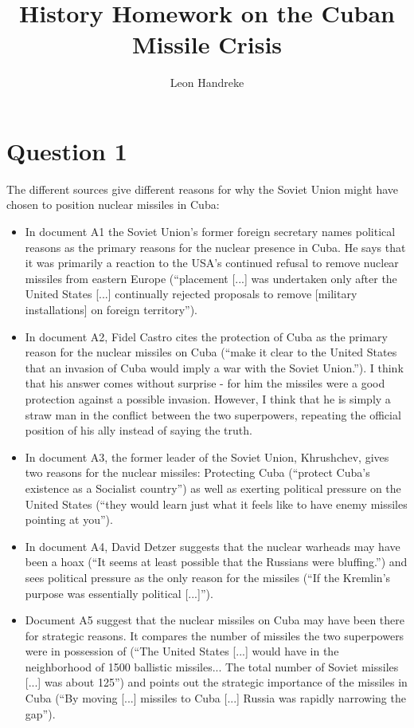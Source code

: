 \documentclass[11pt]{article}
\title{History Homework on the Cuban Missile Crisis}
\author{Leon Handreke}
\date{}                                           %
\begin{document}
\onehalfspacing
\maketitle
{}\selectfont

\section{Question 1}
The different sources give different reasons for why the Soviet Union might have chosen to position nuclear missiles in Cuba:

\begin{itemize}
\item In document A1 the Soviet Union's former foreign secretary names political reasons as the primary reasons for the nuclear presence in Cuba. He says that it was primarily a reaction to the USA's continued refusal to remove nuclear missiles from eastern Europe (``placement [...] was undertaken only after the United States [...] continually rejected proposals to remove [military installations] on foreign territory'').

\item In document A2, Fidel Castro cites the protection of Cuba as the primary reason for the nuclear missiles on Cuba (``make it clear to the United States that an invasion of Cuba would imply a war with the Soviet Union.''). I think that his answer comes without surprise - for him the missiles were a good protection against a possible invasion. However, I think that he is simply a straw man in the conflict between the two superpowers, repeating the official position of his ally instead of saying the truth.

\item In document A3, the former leader of the Soviet Union, Khrushchev, gives two reasons for the nuclear missiles: Protecting Cuba (``protect Cuba's existence as a Socialist country'') as well as exerting political pressure on the United States (``they would learn just what it feels like to have enemy missiles pointing at you'').

\item In document A4, David Detzer suggests that the nuclear warheads may have been a hoax (``It seems at least possible that the Russians were bluffing.'') and sees political pressure as the only reason for the missiles (``If the Kremlin's purpose was essentially political [...]'').

\item Document A5 suggest that the nuclear missiles on Cuba may have been there for strategic reasons. It compares the number of missiles the two superpowers were in possession of (``The United States [...] would have in the neighborhood of 1500 ballistic missiles... The total number of Soviet missiles [...] was about 125'') and points out the strategic importance of the missiles in Cuba (``By moving [...] missiles to Cuba [...] Russia was rapidly narrowing the gap'').
\end{itemize}
\end{document}
